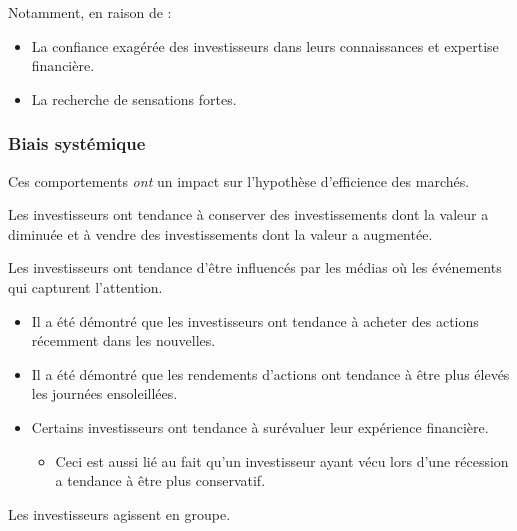 \documentclass[10pt, french]{article}
\begin{document}
\begin{multicols*}{2}
\begin{definitionNOHFILLsub}
Notamment, en raison de : 
\begin{itemize}
	\item	La confiance exagérée des investisseurs dans leurs connaissances et expertise financière.
	\item	La recherche de sensations fortes.
\end{itemize}
\end{definitionNOHFILLsub}



\subsubsection{Biais systémique}
Ces comportements \textit{\textit{ont}} un impact sur l'hypothèse d'efficience des marchés.

\begin{definitionNOHFILLsub}
Les investisseurs ont tendance à conserver des investissements dont la valeur a diminuée et à vendre des investissements dont la valeur a augmentée.
\end{definitionNOHFILLsub}

\begin{definitionNOHFILLsub}
Les investisseurs ont tendance d'être influencés par les médias où les événements qui capturent l'attention.
\begin{itemize}
	\item	Il a été démontré que les investisseurs ont tendance à acheter des actions récemment dans les nouvelles.
	\item	Il a été démontré que les rendements d'actions ont tendance à être plus élevés les journées ensoleillées.
	\item	Certains investisseurs ont tendance à surévaluer leur expérience financière.
		\begin{itemize}
		\item	Ceci est aussi lié au fait qu'un investisseur ayant vécu lors d'une récession a tendance à être plus conservatif.
		\end{itemize}
\end{itemize}
\end{definitionNOHFILLsub}

\begin{definitionNOHFILLsub}
Les investisseurs agissent en groupe.	\\


\end{definitionNOHFILLsub}
\end{multicols*}
\end{document}
